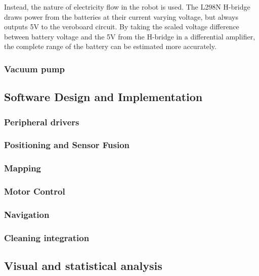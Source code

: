 Instead, the nature of electricity flow in the robot is used. The L298N H-bridge draws power from the batteries at their current varying voltage, but always outputs 5V to the veroboard circuit. By taking the scaled voltage difference between battery voltage and the 5V from the H-bridge in a differential amplifier, the complete range of the battery can be estimated more accurately.

\subsubsection{Vacuum pump}
\label{sec:vacuum}

\subsection{Software Design and Implementation}

\subsubsection{Peripheral drivers}
\label{sec:periph}

\subsubsection{Positioning and Sensor Fusion}
\label{sec:position}

\subsubsection{Mapping}
\label{sec:mapping}

\subsubsection{Motor Control}
\label{sec:control}

\subsubsection{Navigation}
\label{sec:navigation}



\subsubsection{Cleaning integration}
\label{sec:cleaning}

\subsection{Visual and statistical analysis}
\label{sec:stats}

\newpage


